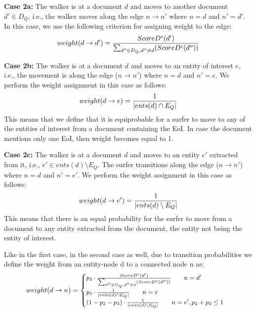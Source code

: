 {\vspace{2mm}\noindent
{\bf Case 2a:} The walker is at a document $d$ and moves to another document $d' \in D_Q$,
i.e., the walker moves along the edge $n \rightarrow n'$ where $n=d$ and $n'=d'$.
In this case, we use the following criterion for assigning weight to the edge:
\begin{equation}
\begin{split}
\small
weight(d \rightarrow d') = \frac{ScoreD^{c}(d')}{\sum_{d'' \in D_Q , d'' \neq d}(ScoreD^{c}(d''))}
\end{split}
\end{equation}

\vspace{2mm}\noindent
{\bf Case 2b:} The walker is at a document $d$ and moves to an entity of interest $e$,
i.e., the movement is along the edge ($n \rightarrow n'$) where $n=d$ and $n'=e$.
We perform the weight assignment in this case as follows:
\begin{equation}
\begin{split}
\small
weight(d \rightarrow e) = \frac{1}{|ents(d) \cap E_Q|}
\end{split}
\end{equation}
This means that we define that it is equiprobable for a surfer to move to any of the
entities of interest from a document containing the EoI. In case the document mentions
only one EoI, then weight becomes equal to 1.

\vspace{2mm}\noindent
{\bf Case 2c:} The walker is at a document $d$ and moves to an entity $e'$ extracted
from it, i.e., $e' \in ents(d) \setminus E_Q$.
The surfer transitions along the edge ($n \rightarrow n'$) where $n=d$ and $n'=e'$.
We perform the weight assignment in this case as follows:
\begin{equation}
\begin{split}
\small
weight(d \rightarrow e') = \frac{1}{|ents(d) \setminus E_Q|}
\end{split}
\end{equation}
This means that there is an equal probability for the surfer to move from a document
to any entity extracted from the document, the entity not being the entity of interest.

\vspace{2mm}\noindent
Like in the first case, in the second case as well, due to transition probabilities we
define the weight from an entity-node d to a connected node n as:
\begin{gather}
\small
weight(d \rightarrow n) = \begin{cases}
    p_2 \cdot \frac{ScoreD^{c}(d')}{\sum_{d'' \in D_Q , d'' \neq d}(ScoreD^{c}(d''))}
    \qquad n = d'\\
    p_3 \cdot \frac{1}{|ents(d) \cap E_Q|}
    \qquad n = e\\
    (1-p_2-p_3) \cdot \frac{1}{|ents(d) \setminus E_Q|} \qquad n = e', p_2+p_3 \leq 1
\end{cases}
\end{gather}

}
